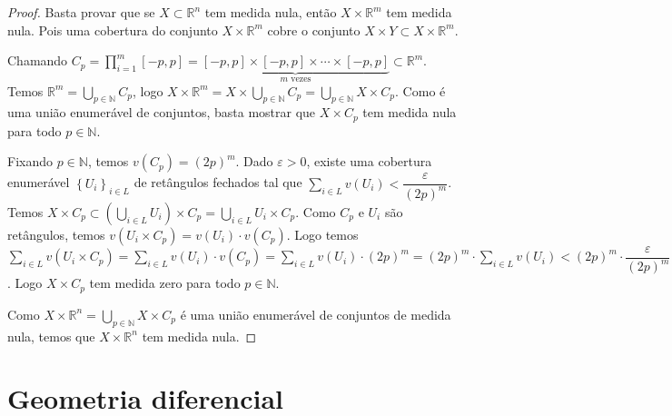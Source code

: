 \documentclass{article}
\theoremstyle{plain}
\theoremstyle{definition}
\theoremstyle{remark}
\begin{document}
\begin{proof}
	Basta provar que se $X\subset \mathbb{R}^n$ tem medida nula, então $X\times \mathbb{R}^m$ tem medida nula. Pois uma cobertura do conjunto $X\times \mathbb{R}^m$ cobre o conjunto $X\times Y \subset X \times \mathbb{R}^m$.


	Chamando $C_p =  \displaystyle\prod_{i  =  1}^{m} [-p, p] =\underbrace{ [-p,p] \times [-p,p]\times \cdots \times [-p,p]}_{m \text{ vezes}} \subset \mathbb{R}^m$. Temos $\mathbb{R}^m = \displaystyle\bigcup_{p \in \mathbb{N}} C_p$, logo $X\times \mathbb{R}^m = X\times\displaystyle\bigcup_{p\in \mathbb{N}} C_p = \displaystyle\bigcup_{p\in \mathbb{N}} X\times C_p$. Como é uma união enumerável de conjuntos, basta mostrar que $X\times C_p$ tem medida nula para todo $p\in \mathbb{N}$. 

	Fixando $ p \in \mathbb{N}$, temos $v\left(C_p\right) = (2p)^m$. Dado $\varepsilon > 0$, existe uma cobertura enumerável $\left\{ U_i\right\}_{i\in L}$ de retângulos fechados tal  que $\displaystyle\sum_{i \in L} v\left(U_i\right) < \dfrac{\varepsilon}{(2p)^m}$. Temos $X \times C_p \subset \left( \displaystyle\bigcup_{i \in L} U_i\right) \times C_p = \displaystyle\bigcup_{i \in L} U_i\times C_p$. Como $C_p$ e $U_i$ são retângulos, temos $v\left(U_i\times C_p \right) = v\left( U_i\right) \cdot v\left( C_p\right)$. Logo temos $\displaystyle\sum_{i \in L} v\left(U_i\times C_p\right) = \displaystyle\sum_{i \in L} v\left(U_i\right)\cdot v\left( C_p\right) = \displaystyle\sum_{i \in L} v\left(U_i\right) \cdot (2p)^{m} =  (2p)^{m}\cdot \displaystyle\sum_{i \in L} v\left(U_i\right) < (2p)^{m}\cdot \dfrac{\varepsilon}{(2p)^{m}} = \varepsilon$. Logo $X\times C_p$ tem medida zero para todo $p\in \mathbb{N}$.


	Como $X\times \mathbb{R}^n = \displaystyle\bigcup_{p\in \mathbb{N}} X\times C_p$ é uma união enumerável de conjuntos de medida nula, temos  que $X\times \mathbb{R}^n$ tem medida nula.

	
\end{proof}
\section{Geometria diferencial}
\end{document}
